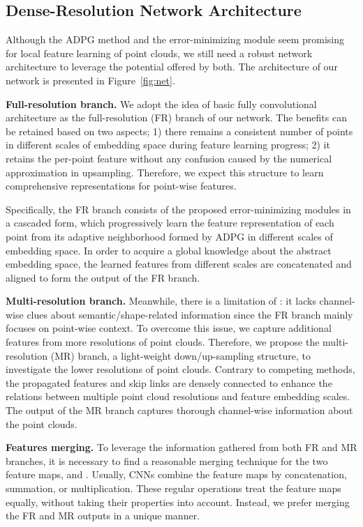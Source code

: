 \documentclass[10pt,twocolumn,letterpaper]{article}
\begin{document}
\subsection{Dense-Resolution Network Architecture}
\label{sec:dr}
Although the ADPG method and the error-minimizing module seem promising for local feature learning of point clouds, we still need a robust network architecture to leverage the potential offered by both. The architecture of our network is presented in Figure~\ref{fig:net}.

\noindent \textbf{Full-resolution branch.} We adopt the idea of basic fully convolutional architecture as the full-resolution (FR) branch of our network. The benefits can be retained based on two aspects; 1) there remains a consistent number of points in different scales of embedding space during feature learning progress; 2) it retains the per-point feature without any confusion caused by the numerical approximation in upsampling. Therefore, we expect this structure to learn comprehensive representations for point-wise features.

Specifically, the FR branch consists of the proposed error-minimizing modules in a cascaded form, which progressively learn the feature representation of each point from its adaptive neighborhood formed by ADPG in different scales of embedding space. In order to acquire a global knowledge about the abstract embedding space, the learned features from different scales are concatenated and aligned to form the output  of the FR branch.    

\noindent \textbf{Multi-resolution branch.} Meanwhile, there is a limitation of : it lacks channel-wise clues about semantic/shape-related information since the FR branch mainly focuses on point-wise context. To overcome this issue, we capture additional features from more resolutions of point clouds. Therefore, we propose the multi-resolution (MR) branch, a light-weight down/up-sampling structure, to investigate the lower resolutions of point clouds. Contrary to competing methods, the propagated features and skip links are densely connected to enhance the relations between multiple point cloud resolutions and feature embedding scales. The output  of the MR branch captures thorough channel-wise information about the point clouds.

\noindent \textbf{Features merging.} To leverage the information gathered from both FR and MR branches, it is necessary to find a reasonable merging technique for the two feature maps, \ie  and . Usually, CNNs combine the feature maps by concatenation, summation, or multiplication. These regular operations treat the feature maps equally, without taking their properties into account. Instead, we prefer merging the FR and MR outputs in a unique manner.
\end{document}
